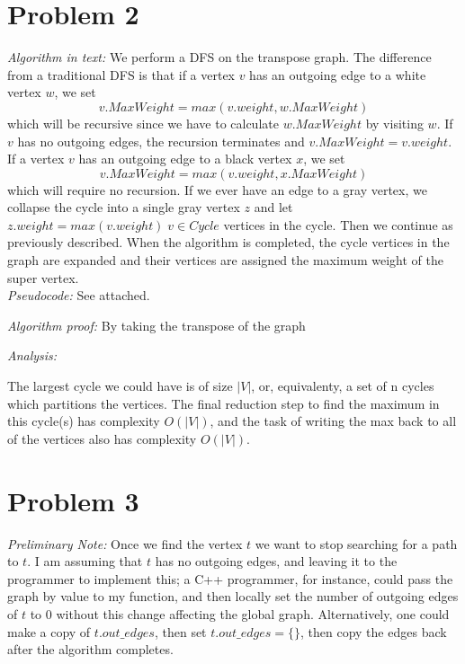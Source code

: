 \documentclass[10pt]{article}
\begin{document}
\section*{Problem 2}
\emph{Algorithm in text:}
We perform a DFS on the transpose graph. The difference from a traditional DFS is that if a vertex $v$ has an outgoing edge to a white vertex $w$, we set 
\begin{equation*}
v.MaxWeight = max(v.weight, w.MaxWeight)
\end{equation*}
 which will be recursive since we have to calculate $w.MaxWeight$ by visiting $w$. If $v$ has no outgoing edges, the recursion terminates and $v.MaxWeight = v.weight$. If a vertex $v$ has an outgoing edge to a black vertex $x$, we set 
\begin{equation*} 
 v.MaxWeight = max(v.weight, x.MaxWeight)
 \end{equation*}
 which will require no recursion. If we ever have an edge to a gray vertex, we collapse the cycle into a single gray vertex $z$ and let $z.weight = max(v.weight)\; v\in Cycle$ vertices in the cycle. Then we continue as previously described. When the algorithm is completed, the cycle vertices in the graph are expanded and their vertices are assigned the maximum weight of the super vertex.\\
  
\emph{Pseudocode: } See attached.

\emph{Algorithm proof: } By taking the transpose of the graph

\emph{Analysis: }


 The largest cycle we could have is of size $|V|$, or, equivalenty, a set of n cycles which partitions the vertices. The final reduction step to find the maximum in this cycle(s) has complexity $O(|V|)$, and the task of writing the max back to all of the vertices also has complexity $O(|V|)$.

\section*{Problem 3}
\emph{Preliminary Note:} Once we find the vertex $t$ we want to stop searching for a path to $t$. I am assuming that $t$ has no outgoing edges, and leaving it to the programmer to implement this; a C++ programmer, for instance, could pass the graph by value to my function, and then locally set the number of outgoing edges of $t$ to 0 without this change affecting the global graph. Alternatively, one could make a copy of $t.out\_edges$, then set $t.out\_edges = \{\}$, then copy the edges back after the algorithm completes. \\
\end{document}
